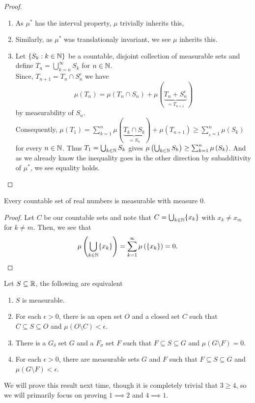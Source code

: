 \begin{proof}
	\begin{enumerate}
		\item As \( \mu^{*}\) has the interval property, \( \mu\) trivially inherits this,
			\item Similarly, as \( \mu^{*}\) was translationaly invariant, we see \( \mu\) inherits this.
				\item Let \(\{S_{k} : k \in \mathbb{N}\} \) be a countable, disjoint collection of measurable sets and define \(T_{n} = \bigcup_{k = n} ^{\infty}S_{k}\) for \(n \in \mathbb{N}\).\\
					Since, \(T_{n  + 1} = T_{n} \cap S_{n}^{c}\) we have \[
					\mu \left( T_{n} \right) = \mu \left( T_{n} \cap S_{n} \right) + \mu \left( \underbrace{T_{n} + S_{n}^{c}}_{= T_{n + 1}}	 \right)
				\] by measurability of \(S_{n}\). \\
				Consequently, \( \mu \left( T_1 \right) = \sum_{k=1}^{n} \mu \left( \underbrace{T_{k} \cap S_{k}}_{= S_{n}} \right) + \mu \left( T_{n + 1} \right) \ge \sum_{_{k}=1}^{n} \mu \left( S_{k} \right)  \) for every \( n \in \mathbb{N}\).
				Thus \(T_1 = \bigcup_{k \in \mathbb{N}} S_{k}\) gives \( \mu\left( \bigcup_{k \in \mathbb{N}} S_{k} \right)  \ge \sum_{k= 1}^{n} \mu\left( S_{k} \right) \). And as we already know the inequality goes in the other direction by subadditivity of \( \mu^{*}\), we see equality holds.
	\end{enumerate}
\end{proof}
\begin{corollary}
	Every countable set of real numbers is measurable with measure \(0\).
\end{corollary}
\begin{proof}
	Let \(C\) be our countable sets and note that \(C = \bigcup_{k \in \mathbb{N}} \{x_{k}\} \) with \(x_{k} \neq x_{m}\) for \(k \neq m\). Then, we see that \[
		\mu \left( \bigcup_{k \in \mathbb{N}} \{x_{k}\}  \right)  = \sum_{k=1}^{\infty} \mu \left( \{x_{k}\}  \right)  = 0
	.\]
\end{proof}
\begin{theorem}
	Let \(S \subseteq \mathbb{R}\), the following are equivalent
	\begin{enumerate}
		\item \(S\) is measurable.
		\item For each \(\epsilon > 0\), there is an open set \(O\) and a closed set \(C\) such that \(C \subseteq S \subseteq O\) and \( \mu \left( O \setminus C \right)  < \epsilon\).
		\item There is a \(G_{\delta}\) set \(G\) and a \(F_{\sigma}\) set \(F\) such that \(F \subseteq S \subseteq G\) and \( \mu \left( G \setminus F \right)  = 0\).
		\item For each \(\epsilon > 0\), there are measurable sets \(G\) and \(F\) such that \(F \subseteq S \subseteq G\) and \( \mu \left( G \setminus F \right) < \epsilon\).
	\end{enumerate}
	We will prove this result next time, though it is completely trivial that \(3 \ge 4\), so we will primarily focus on proving \(1 \implies 2\) and \(4 \implies 1\).
\end{theorem}
